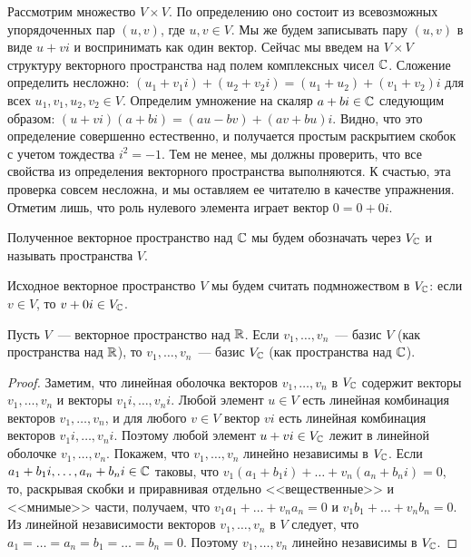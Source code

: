 Рассмотрим множество $V\times V$. По определению оно состоит
из всевозможных упорядоченных пар $(u,v)$, где $u,v\in V$.
Мы же будем записывать пару $(u,v)$ в виде $u+vi$
и воспринимать как один вектор.
Сейчас мы введем на $V\times V$ структуру векторного пространства
над полем комплексных чисел $\mathbb C$.
Сложение определить несложно:
$(u_1+v_1i) + (u_2 +v_2i) = (u_1+u_2) + (v_1+v_2)i$
для всех $u_1,v_1,u_2,v_2\in V$.
Определим умножение на скаляр $a+bi\in\mathbb C$ следующим образом:
$(u + vi)(a + bi) = (au-bv) + (av+bu)i$.
Видно, что это определение совершенно естественно, и получается простым
раскрытием скобок с учетом тождества $i^2=-1$. Тем не менее, мы должны
проверить, что все свойства из определения векторного пространства
выполняются. К счастью, эта проверка совсем несложна, и мы оставляем
ее читателю в качестве упражнения. Отметим лишь, что роль нулевого элемента
играет вектор $0 = 0+0i$.

\begin{definition}
Полученное векторное пространство над $\mathbb C$ мы будем обозначать
через $V_\mathbb C$ и называть  пространства $V$.
\end{definition}
Исходное векторное пространство $V$ мы будем
считать подмножеством в $V_\mathbb C$: если $v\in V$, то
$v+0i\in V_\mathbb C$.

\begin{proposition}\label{prop:complexification-basis}
Пусть $V$~--- векторное пространство над $\mathbb R$.
Если $v_1,\dots,v_n$~--- базис $V$ (как пространства над $\mathbb R$), то
$v_1,\dots,v_n$~--- базис $V_\mathbb C$ (как пространства над $\mathbb C$).
\end{proposition}
\begin{proof}
Заметим, что линейная оболочка векторов $v_1,\dots,v_n$ в $V_\mathbb C$
содержит векторы $v_1,\dots,v_n$ и векторы $v_1i,\dots,v_ni$.
Любой элемент $u\in V$ есть линейная комбинация векторов
$v_1,\dots,v_n$, и для любого $v\in V$ вектор $vi$ есть линейная
комбинация векторов $v_1i,\dots,v_ni$.
Поэтому любой элемент $u+vi\in V_\mathbb C$ лежит в линейной оболочке
$v_1,\dots,v_n$. Покажем, что $v_1,\dots,v_n$ линейно независимы
в $V_\mathbb C$. Если $a_1+b_1i,\dots,a_n+b_ni\in\mathbb C$ таковы, что
$v_1(a_1+b_1i) + \dots + v_n(a_n+b_ni) = 0$, то,
раскрывая скобки и приравнивая отдельно <<вещественные>> и <<мнимые>> части,
получаем, что
$v_1a_1+\dots+v_na_n = 0$
и $v_1b_1+\dots + v_nb_n = 0$. Из линейной независимости
векторов $v_1,\dots,v_n$ в $V$ следует, что
$a_1=\dots=a_n = b_1 = \dots = b_n = 0$.
Поэтому $v_1,\dots,v_n$ линейно независимы в $V_\mathbb C$.
\end{proof}

